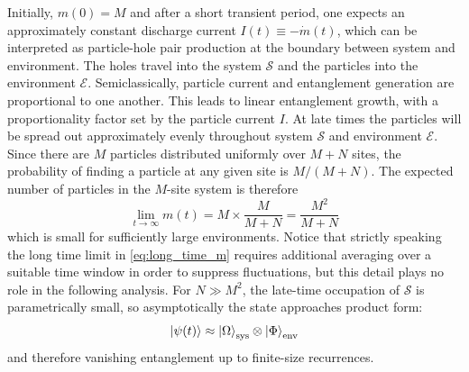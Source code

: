 \documentclass[12pt,oneside,openright]{report}
\theoremstyle{definition}
\theoremstyle{plain}
\theoremstyle{remark}
\begin{document}
Initially, $m(0)= M$ and after a short transient period, one expects an approximately constant discharge current
\(I(t)\equiv -\dot m(t)\), which can be interpreted as particle-hole pair production at the boundary between system and environment.
The holes travel into the system $\mathcal{S}$ and the particles into the environment $\mathcal{E}$.
Semiclassically, particle current and entanglement generation are proportional to one another.
This leads to linear entanglement growth, with a proportionality factor set by the particle current $I$.
At late times the particles will be spread out approximately evenly throughout system $\mathcal{S}$ and environment $\mathcal{E}$. 
Since there are $M$ particles distributed uniformly over $M+N$ sites, the probability of finding a particle at any given site is $M/(M+N)$.
The expected number of particles in the $M$-site system is therefore
\begin{equation}\label{eq:long_time_m}
  \lim_{t\to \infty} m(t) = M \times \frac{M}{M+N} = \frac{M^2}{M+N}
\end{equation}
which is small for sufficiently large environments. Notice that strictly speaking the long time limit in \eqref{eq:long_time_m} requires 
additional averaging over a suitable time window in order to suppress
fluctuations, but this detail plays no role in the following analysis.
For $N\gg M^2$, the late-time occupation of $\mathcal{S}$ is parametrically small, so asymptotically the state approaches product form:
\begin{equation}
  \ket{\psi(t)} \approx \ket{\Omega}_\mathrm{sys} \otimes \ket{\Phi}_\mathrm{env}
\end{equation}
and therefore vanishing entanglement up to finite-size recurrences.
\end{document}
